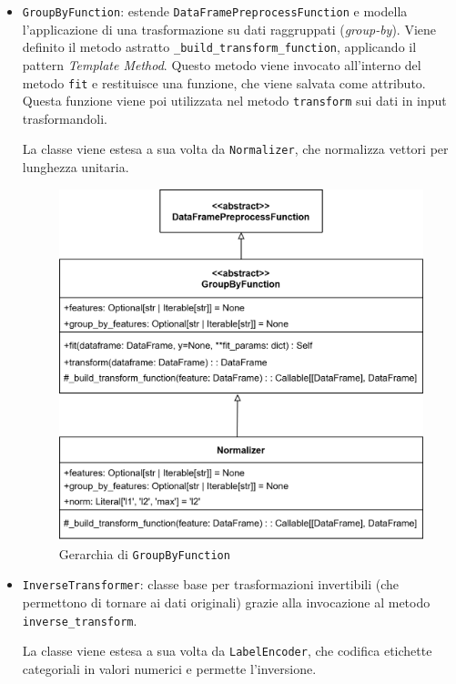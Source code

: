 \begin{itemize}
    \item \texttt{GroupByFunction}: estende \texttt{DataFramePreprocessFunction} e modella l'applicazione di una trasformazione su dati raggruppati (\textit{group-by}). Viene definito il metodo astratto \texttt{\_build\_transform\_function}, applicando il pattern \textit{Template Method}. Questo metodo viene invocato all'interno del metodo \texttt{fit} e restituisce una funzione, che viene salvata come attributo. Questa funzione viene poi utilizzata nel metodo \texttt{transform} sui dati in input trasformandoli.
    
    La classe viene estesa a sua volta da \texttt{Normalizer}, che normalizza vettori per lunghezza unitaria.

    \begin{figure}[H]
        \centering
        \includegraphics[scale=0.2]{figures/UML/preprocessing/group_by.png}
        \caption{Gerarchia di \texttt{GroupByFunction}}
    \end{figure}

    \item \texttt{InverseTransformer}: classe base per trasformazioni invertibili (che permettono di tornare ai dati originali) grazie alla invocazione al metodo \texttt{inverse\_transform}.
    
    La classe viene estesa a sua volta da \texttt{LabelEncoder}, che codifica etichette categoriali in valori numerici e permette l'inversione.
    

\end{itemize}
